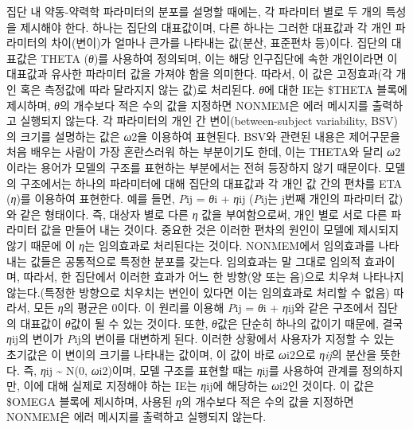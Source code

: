 \documentclass[
  10pt,
]{krantz}
\begin{document}
집단 내 약동-약력학 파라미터의 분포를 설명할 때에는, 각 파라미터 별로 두 개의 특성을 제시해야 한다. 하나는 집단의 대표값이며, 다른 하나는 그러한 대표값과 각 개인 파라미터의 차이(변이)가 얼마나 큰가를 나타내는 값(분산, 표준편차 등)이다. 집단의 대표값은 THETA (\emph{θ})를 사용하여 정의되며, 이는 해당 인구집단에 속한 개인이라면 이 대표값과 유사한 파라미터 값을 가져야 함을 의미한다. 따라서, 이 값은 고정효과(각 개인 혹은 측정값에 따라 달라지지 않는 값)로 처리된다. \emph{θ}에 대한 IE는 \$THETA 블록에 제시하며, \emph{θ}의 개수보다 적은 수의 값을 지정하면 NONMEM은 에러 메시지를 출력하고 실행되지 않는다. 각 파라미터의 개인 간 변이(between-subject variability, BSV)의 크기를 설명하는 값은 \emph{ω}2을 이용하여 표현된다. BSV와 관련된 내용은 제어구문을 처음 배우는 사람이 가장 혼란스러워 하는 부분이기도 한데, 이는 THETA와 달리 \emph{ω}2이라는 용어가 모델의 구조를 표현하는 부분에서는 전혀 등장하지 않기 때문이다. 모델의 구조에서는 하나의 파라미터에 대해 집단의 대표값과 각 개인 값 간의 편차를 ETA (\emph{η})를 이용하여 표현한다. 예를 들면, \emph{P}ij = \emph{θ}i + \emph{η}ij (\emph{P}ij는 j번째 개인의 파라미터 값)와 같은 형태이다. 즉, 대상자 별로 다른 \emph{η} 값을 부여함으로써, 개인 별로 서로 다른 파라미터 값을 만들어 내는 것이다. 중요한 것은 이러한 편차의 원인이 모델에 제시되지 않기 때문에 이 \emph{η}는 임의효과로 처리된다는 것이다. NONMEM에서 임의효과를 나타내는 값들은 공통적으로 특정한 분포를 갖는다. 임의효과는 말 그대로 임의적 효과이며, 따라서, 한 집단에서 이러한 효과가 어느 한 방향(양 또는 음)으로 치우쳐 나타나지 않는다.(특정한 방향으로 치우치는 변인이 있다면 이는 임의효과로 처리할 수 없음) 따라서, 모든 \emph{η}의 평균은 0이다. 이 원리를 이용해 \emph{P}ij = \emph{θ}i + \emph{η}ij와 같은 구조에서 집단의 대표값이 \emph{θ}값이 될 수 있는 것이다. 또한, \emph{θ}값은 단순히 하나의 값이기 때문에, 결국 \emph{η}ij의 변이가 \emph{P}ij의 변이를 대변하게 된다. 이러한 상황에서 사용자가 지정할 수 있는 초기값은 이 변이의 크기를 나타내는 값이며, 이 값이 바로 \emph{ω}i2으로 \emph{ηij}의 분산을 뜻한다. 즉, \emph{η}ij \textasciitilde{} N(0, \emph{ω}i2)이며, 모델 구조를 표현할 때는 \emph{η}ij를 사용하여 관계를 정의하지만, 이에 대해 실제로 지정해야 하는 IE는 \emph{η}ij에 해당하는 \emph{ω}i2인 것이다. 이 값은 \$OMEGA 블록에 제시하며, 사용된 \emph{η}의 개수보다 적은 수의 값을 지정하면 NONMEM은 에러 메시지를 출력하고 실행되지 않는다.
\end{document}
